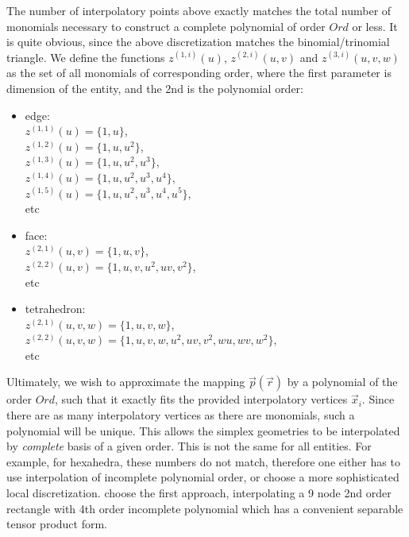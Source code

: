 \noindent
The number of interpolatory points above exactly matches the total number of monomials necessary to construct a complete polynomial of order $Ord$ or less. It is quite obvious, since the above discretization matches the binomial/trinomial triangle. We define the functions $z^{(1,i)}(u)$, $z^{(2,i)}(u,v)$ and $z^{(3,i)}(u,v,w)$ as the set of all monomials of corresponding order, where the first parameter is dimension of the entity, and the 2nd is the polynomial order:
\begin{itemize}
	\item edge: \\
		$z^{(1,1)}(u) = \{1, u\}$, \\
		$z^{(1,2)}(u) = \{1, u, u^2\}$, \\
		$z^{(1,3)}(u) = \{1, u, u^2, u^3\}$, \\
		$z^{(1,4)}(u) = \{1, u, u^2, u^3, u^4\}$, \\
		$z^{(1,5)}(u) = \{1, u, u^2, u^3, u^4, u^5\}$, \\
		etc
	\item face:	\\
		$z^{(2,1)}(u,v)	= \{1, u, v\}$, \\
		$z^{(2,2)}(u,v) = \{1, u, v, u^2, uv, v^2\}$, \\
		etc
	\item tetrahedron: \\
		$z^{(2,1)}(u,v,w) = \{1, u, v, w\}$, \\ 
		$z^{(2,2)}(u,v,w) = \{1, u, v, w, u^2, uv, v^2, wu, wv, w^2\}$, \\
		etc
\end{itemize}

\noindent
Ultimately, we wish to approximate the mapping $\vec{p}(\vec{r})$ by a polynomial of the order $Ord$, such that it exactly fits the provided interpolatory vertices $\vec{x}_i$. Since there are as many interpolatory vertices as there are monomials, such a polynomial will be unique. This allows the simplex geometries to be interpolated by \textit{complete} basis of a given order. This is not the same for all entities. For example, for hexahedra, these numbers do not match, therefore one either has to use interpolation of incomplete polynomial order, or choose a more sophisticated local discretization. \citeauthor{volakis+2006}\cite{volakis+2006} choose the first approach, interpolating a 9 node 2nd order rectangle with 4th order incomplete polynomial which has a convenient separable tensor product form. \\

